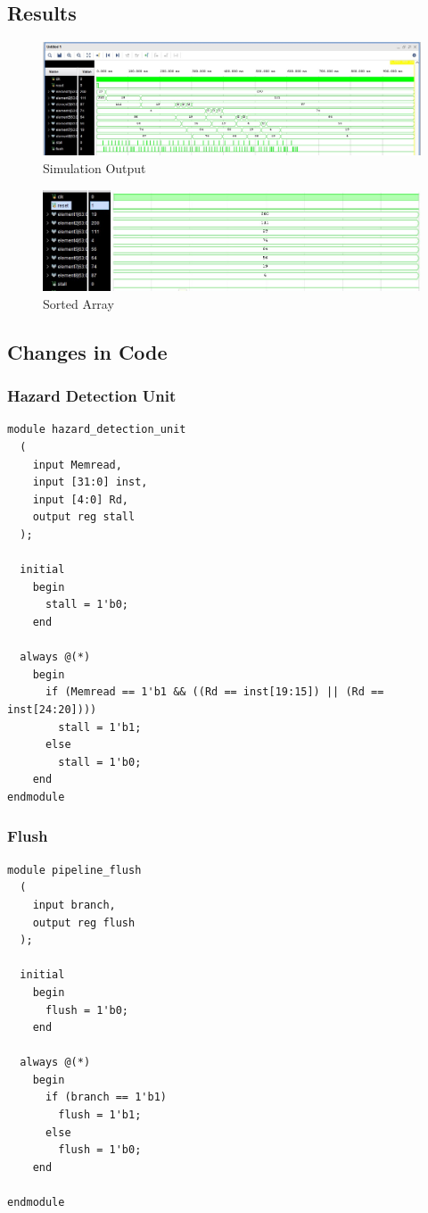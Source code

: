 \documentclass{article}
\begin{document}
\subsection{Results}
\begin{figure} [ht]
    \centering 
    \includegraphics[width=1\textwidth]{task 3 simulation.jpg} 
    \caption{Simulation Output} 
    \label{fig:Output 4} 
\end{figure}
\begin{figure} 
    \centering 
    \includegraphics[width=1\textwidth]{task 3 sorted array.jpg} 
    \caption{Sorted Array} 
    \label{fig:Array 2s} 
\end{figure}
\subsection{Changes in Code}
\subsubsection{Hazard Detection Unit}
\begin{lstlisting}[caption={Design Module for Hazard Detection Unit}, captionpos=b, language=RISC-V]
module hazard_detection_unit
  (
    input Memread,
    input [31:0] inst,
    input [4:0] Rd,
    output reg stall
  );
  
  initial
    begin
      stall = 1'b0;
    end
  
  always @(*)
    begin
      if (Memread == 1'b1 && ((Rd == inst[19:15]) || (Rd == inst[24:20])))
        stall = 1'b1;
      else
        stall = 1'b0;
    end
endmodule
\end{lstlisting}
\subsubsection{Flush}
\begin{lstlisting}[caption={Design Module for Flush}, captionpos=b, language=RISC-V]
module pipeline_flush
  (
    input branch,
    output reg flush
  );
  
  initial
    begin
      flush = 1'b0;
    end
  
  always @(*)
    begin
      if (branch == 1'b1)
        flush = 1'b1;
      else
        flush = 1'b0;
    end
  
endmodule
\end{lstlisting}
\end{document}
